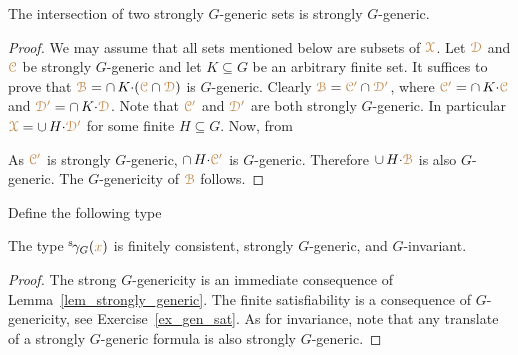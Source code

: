 \begin{lemma}\label{lem_strongly_generic}
  The intersection of two strongly $G$-generic sets is strongly $G$-generic.
\end{lemma}

\begin{proof}
  We may assume that all sets mentioned below are subsets of ${\color{brown}\EuScript X}$.
  Let ${\color{brown}\EuScript D}$ and ${\color{brown}\EuScript C}$ be strongly $G$-generic and let $K\subseteq G$ be an arbitrary finite set.
  It suffices to prove that ${\color{brown}\EuScript B}=\cap\, K{\cdot}({\color{brown}\EuScript C}\cap{\color{brown}\EuScript D})$ is $G$-generic. 
  Clearly ${\color{brown}\EuScript B}={\color{brown}\EuScript C'}\cap{\color{brown}\EuScript D'}$, where ${\color{brown}\EuScript C'}=\cap\, K{\cdot}{\color{brown}\EuScript C}$ and ${\color{brown}\EuScript D'}=\cap\, K{\cdot}{\color{brown}\EuScript D}$.
  Note that ${\color{brown}\EuScript C'}$ and ${\color{brown}\EuScript D'}$ are both strongly $G$-generic.
  In particular ${\color{brown}\EuScript X}=\cup\,H{\cdot}\color{brown}\EuScript D'$ for some finite $H\subseteq G$.
  Now, from
  

  
  
  
  As ${\color{brown}\EuScript C'}$ is strongly $G$-generic, $\cap\, H{\cdot}{\color{brown}\EuScript C'}$ is $G$-generic.
  Therefore $\cup\,H{\cdot}{\color{brown}\EuScript B}$ is also $G$-generic.
  The $G$-genericity of ${\color{brown}\EuScript B}$ follows.
\end{proof}

Define the following type


\begin{corollary}\label{corol_str_gen}
  The type ${}^{\rm s}\kern-.2ex\gamma_G({\color{brown} x})$ is finitely consistent, strongly $G$-generic, and $G$-invariant.
\end{corollary}

\begin{proof}
  The strong $G$-genericity is an immediate consequence of Lemma~\ref{lem_strongly_generic}.
  The finite satisfiability is a consequence of $G$-genericity, see Exercise~\ref{ex_gen_sat}.
  As for invariance, note that any translate of a strongly $G$-generic formula is also strongly $G$-generic.
\end{proof}

